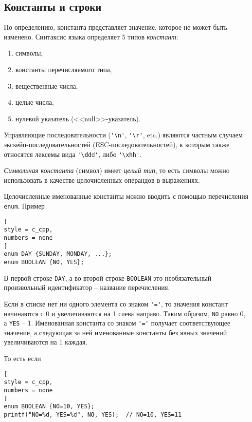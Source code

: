\documentclass[%
	11pt,
	a4paper,
	utf8,
		]{article}
\begin{document}
\subsection{Константы и строки}

По определению, константа представляет значение, которое не может быть изменено. Синтаксис языка определяет 5 типов \emph{констант}:
\begin{enumerate}
	\item символы,
	
	\item константы перечисляемого типа,
	
	\item вещественные числа,
	
	\item целые числа,
	
	\item нулевой указатель (<<null>>-указатель).
\end{enumerate}

Управляющие последовательности (\verb*|'\n'|, \verb|'\r'|, etc.) являются частным случаем экскейп-последо\-вательностей (ESC-последовательностей), к которым также относятся лексемы вида \verb*|'\ddd'|, либо \verb|'\xhh'|.

\emph{Символьная константа} (символ) имеет \emph{целый тип}, то есть символы можно использовать в качестве целочисленных операндов в выражениях.

Целочисленные именованные константы можно вводить с помощью перечисления \verb*|enum|. Пример
\begin{lstlisting}[
style = c_cpp,
numbers = none
]
enum DAY {SUNDAY, MONDAY, ...};
enum BOOLEAN {NO, YES};
\end{lstlisting}

В первой строке \verb*|DAY|, а во второй строке \verb|BOOLEAN| это необязательный произвольный идентификатор -- название перечисления.

Если в списке нет ни одного элемента со знаком \verb*|'='|, то значения констант начинаются с 0 и увеличиваются на 1 слева направо. Таким образом, \verb|NO| равно 0, а \verb*|YES| -- 1. Именованная константа со знаком \verb|'='| получает соответствующее значение, а следующая за ней именованные константы без явных значений увеличиваются на 1 каждая.

То есть если 
\begin{lstlisting}[
style = c_cpp,
numbers = none
]
enum BOOLEAN {NO=10, YES};
printf("NO=%d, YES=%d", NO, YES);  // NO=10, YES=11
\end{lstlisting}
\end{document}
